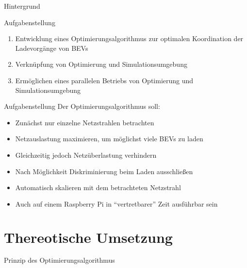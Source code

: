 \documentclass[aspectratio=169]{beamer}
\begin{document}
\begin{frame}{Hintergrund}
	\begin{figure}
		\centering
		
	\end{figure}
\end{frame}


\begin{frame}{Aufgabenstellung}
	\begin{enumerate}[<+->]
		\item Entwicklung eines Optimierungsalgorithmus zur optimalen 
		Koordination der Ladevorgänge von BEVs
		\item Verknüpfung von Optimierung und Simulationsumgebung
		\item Ermöglichen eines parallelen Betriebs von Optimierung und
		Simulationsumgebung
	\end{enumerate}
\end{frame}


\begin{frame}{Aufgabenstellung}
	Der Optimierungsalgorithmus soll:
	\begin{itemize}[<+(1)->]
		\item Zunächst nur einzelne Netzstrahlen betrachten
		\item Netzauslastung maximieren, um möglichst viele BEVs zu laden
		\item Gleichzeitig jedoch Netzüberlastung verhindern
		\item Nach Möglichkeit Diskriminierung beim Laden ausschließen
		\item Automatisch skalieren mit dem betrachteten Netzstrahl
		\item Auch auf einem Raspberry Pi in \enquote{vertretbarer} Zeit 
		ausführbar sein
	\end{itemize}
	
\end{frame}

\section{Thereotische Umsetzung}

\begin{frame}{Prinzip des Optimierungsalgorithmus}
	\begin{figure}
		\centering
		
	\end{figure}
\end{frame}
\end{document}
